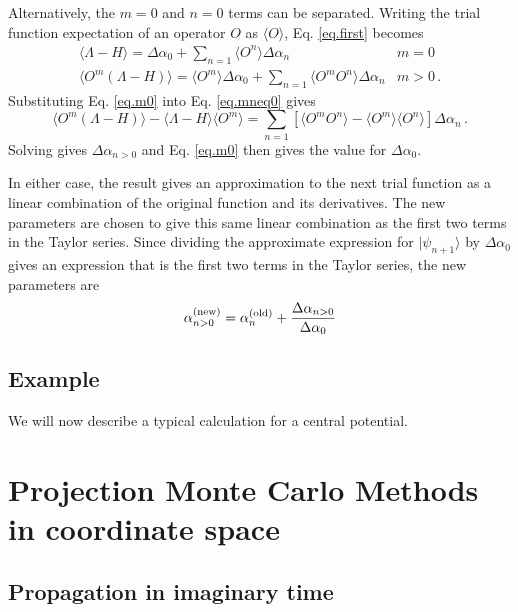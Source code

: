 Alternatively, the $m=0$ and $n=0$ terms can be separated. Writing
the trial function expectation of an operator $O$ as $\langle O\rangle$,
Eq. \ref{eq.first} becomes
\begin{eqnarray}
\label{eq.m0}
\langle \Lambda - H \rangle = \Delta \alpha_0 + \sum_{n=1} \langle O^n\rangle
\Delta \alpha_n & m=0\\
\label{eq.mneq0}
\langle O^m (\Lambda-H) \rangle = \langle O^m\rangle \Delta \alpha_0
+ \sum_{n=1} \langle O^m O^n\rangle \Delta \alpha_n & m > 0 \,.
\end{eqnarray}
Substituting Eq. \ref{eq.m0} into Eq. \ref{eq.mneq0} gives
\begin{equation}
\langle O^m(\Lambda - H) \rangle -\langle \Lambda - H\rangle \langle O^m\rangle
= \sum_{n=1} \left [ \langle O^mO^n\rangle - \langle O^m\rangle
\langle O^n\rangle \right ] \Delta \alpha_n \,.
\end{equation}
Solving gives $\Delta \alpha_{n>0}$ and
Eq. \ref{eq.m0} then gives the value for $\Delta \alpha_0$.

In either case, the result gives an approximation to the next trial
function as a linear combination of the original function and its
derivatives. The new parameters are chosen to give this
same linear combination as the first two terms in the Taylor series.
Since dividing the approximate expression for $|\psi_{n+1}\rangle$
by $\Delta\alpha_0$ gives
an expression that is the first two terms in the Taylor series,
the new parameters are
\begin{equation}
\alpha^{(\rm new)}_{n>0} =
\alpha^{(\rm old)}_n + \frac{\Delta \alpha_{n>0}}{\Delta \alpha_0}
\end{equation}


\subsection{Example}
We will now describe a typical calculation for a central potential. 
\section{Projection Monte Carlo Methods in coordinate space}
\subsection{Propagation in imaginary time}
